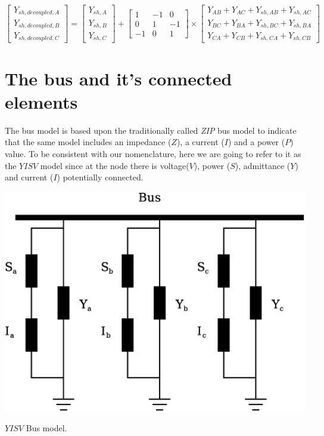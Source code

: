 \documentclass[a4paper,twoside]{tufte-book}
\begin{document}
\begin{equation}
\left[ \begin{array}{c}
Y_{sh, decoupled, A} \\
Y_{sh, decoupled, B} \\
Y_{sh, decoupled, C}
\end{array} \right] = \left[ \begin{array}{c}
Y_{sh,A} \\
Y_{sh,B} \\
Y_{sh,C}
\end{array} \right] + \left[ \begin{array}{ccc}
1 & -1 & 0 \\
0 & 1 & -1 \\
-1 & 0 & 1
\end{array} \right] \times \left[ \begin{array}{c}
Y_{AB} + Y_{AC} + Y_{sh,AB} + Y_{sh,AC} \\
Y_{BC} + Y_{BA} + Y_{sh,BC} + Y_{sh,BA}\\
Y_{CA} + Y_{CB} + Y_{sh,CA} + Y_{sh,CB}
\end{array} \right]
\end{equation}



\chapter{The bus and it's connected elements}

The bus model is based upon the traditionally called \textit{ZIP} bus model to indicate that the same model includes an impedance ($Z$), a current ($I$) and a power ($P$) value. To be consistent with our nomenclature, here we are going to refer to it as the $YISV$ model since at the node there is voltage($V$), power ($S$), admittance ($Y$) and current ($I$) potentially connected.


\begin{marginfigure}
	\includegraphics[width=0.99\linewidth]{img/NodeElements.eps}
	\caption{$YISV$ Bus model.}
	\label{bus_model}
\end{marginfigure}
\end{document}
